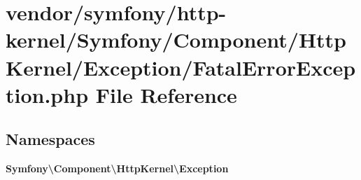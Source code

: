 \section{vendor/symfony/http-\/kernel/\+Symfony/\+Component/\+Http\+Kernel/\+Exception/\+Fatal\+Error\+Exception.php File Reference}
\label{symfony_2http-kernel_2_symfony_2_component_2_http_kernel_2_exception_2_fatal_error_exception_8php}
\subsection*{Namespaces}
\begin{DoxyCompactItemize}
\item 
 {\bf Symfony\textbackslash{}\+Component\textbackslash{}\+Http\+Kernel\textbackslash{}\+Exception}
\end{DoxyCompactItemize}
